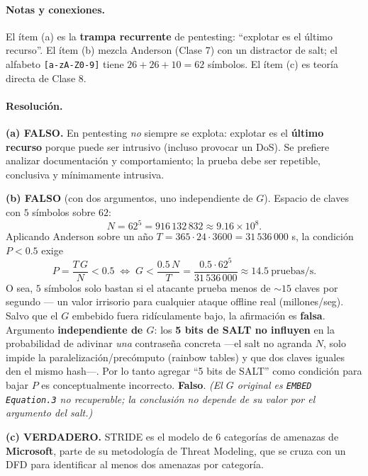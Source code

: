 \paragraph{Notas y conexiones.}
El ítem (a) es la \textbf{trampa recurrente} de pentesting: ``explotar es el último recurso''. El ítem (b) mezcla Anderson (Clase 7) con un distractor de salt; el alfabeto \texttt{[a-zA-Z0-9]} tiene $26+26+10=62$ símbolos. El ítem (c) es teoría directa de Clase 8.

\paragraph{Resolución.}
\textbf{(a) FALSO.} En pentesting \emph{no} siempre se explota: explotar es el \textbf{último recurso} porque puede ser intrusivo (incluso provocar un DoS). Se prefiere analizar documentación y comportamiento; la prueba debe ser repetible, conclusiva y mínimamente intrusiva.

\textbf{(b) FALSO} (con dos argumentos, uno independiente de $G$). Espacio de claves con $5$ símbolos sobre $62$:
\begin{equation*}
  N = 62^{5} = 916\,132\,832 \approx 9.16\times10^{8}.
\end{equation*}
Aplicando Anderson sobre un año $T = 365\cdot24\cdot3600 = 31\,536\,000$ s, la condición $P<0.5$ exige
\begin{equation*}
  P=\frac{T\,G}{N}<0.5 \;\Longleftrightarrow\; G < \frac{0.5\,N}{T} = \frac{0.5\cdot 62^{5}}{31\,536\,000} \approx 14.5\ \text{pruebas/s}.
\end{equation*}
O sea, $5$ símbolos solo bastan si el atacante prueba menos de $\sim 15$ claves por segundo — un valor irrisorio para cualquier ataque offline real (millones/seg). Salvo que el $G$ embebido fuera ridículamente bajo, la afirmación es \textbf{falsa}. Argumento \textbf{independiente de $G$}: los \textbf{5 bits de SALT no influyen} en la probabilidad de adivinar \emph{una} contraseña concreta —el salt no agranda $N$, solo impide la paralelización/precómputo (rainbow tables) y que dos claves iguales den el mismo hash—. Por lo tanto agregar ``5 bits de SALT'' como condición para bajar $P$ es conceptualmente incorrecto. \textbf{Falso}. \emph{(El $G$ original es \texttt{EMBED Equation.3} no recuperable; la conclusión no depende de su valor por el argumento del salt.)}

\textbf{(c) VERDADERO.} STRIDE es el modelo de 6 categorías de amenazas de \textbf{Microsoft}, parte de su metodología de Threat Modeling, que se cruza con un DFD para identificar al menos dos amenazas por categoría.

